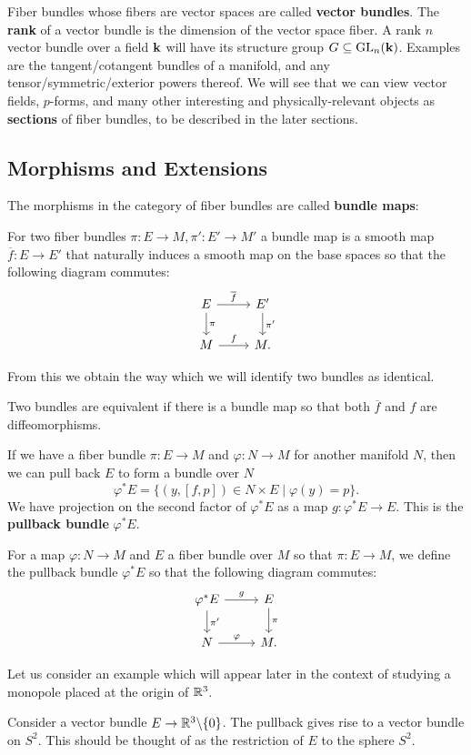 		Fiber bundles whose fibers are vector spaces are called \textbf{vector bundles}. The \textbf{rank} of a vector bundle is the dimension of the vector space fiber. A rank $n$ vector bundle over a field $\mathbf{k}$ will have its structure group $G \subseteq \mathrm{GL}_n(\mathbf{k})$. Examples are the tangent/cotangent bundles of a manifold, and any tensor/symmetric/exterior powers thereof. We will see that we can view vector fields, $p$-forms, and many other interesting and physically-relevant objects as \textbf{sections} of fiber bundles, to be described in the later sections.
		
		\subsection{Morphisms and Extensions}
		The morphisms in the category of fiber bundles are called \textbf{bundle maps}:
		
		\begin{defn}
			For two fiber bundles $\pi: E \rightarrow M, \pi': E' \rightarrow M'$ a bundle map is a smooth map $\overline f: E \rightarrow E'$ that naturally induces a smooth map on the base spaces so that the following diagram commutes:
			\[
			\begin{tikzcd}
			E \arrow{r}{\overline f} \arrow{d}{\pi} & E' \arrow{d}{\pi'} \\
			M \arrow{r}{f} & M.
			\end{tikzcd}
			\]
		\end{defn}
		From this we obtain the way which we will identify two bundles as identical.
		\begin{defn}
			Two bundles are equivalent if there is a bundle map so that both $\overline f$ and $f$ are diffeomorphisms. 
		\end{defn}
		If we have a fiber bundle $\pi: E \rightarrow M$ and $\varphi: N \rightarrow M$ for another manifold $N$, then we can pull back $E$ to form a bundle over $N$
		\[
			\varphi^* E = \{(y,[f,p]) \in N \times E \mid \varphi(y) = p \}.
		\]
		We have projection on the second factor of $\varphi^* E$ as a map $g: \varphi^* E \rightarrow E$. 
		This is the \textbf{pullback bundle} $\varphi^* E$.
		\begin{defn}
			For a map $\varphi: N \rightarrow M$ and $E$ a fiber bundle over $M$ so that $\pi: E \rightarrow M$, we define the pullback bundle $\varphi^* E$ so that the following diagram commutes:
			\[
			\begin{tikzcd}
			\varphi^* E \arrow{r}{g} \arrow{d}{\pi'} & E \arrow{d}{\pi} \\
			N \arrow{r}{\varphi} & M.
			\end{tikzcd}
			\]
		\end{defn}
		Let us consider an example which will appear later in the context of studying a monopole placed at the origin of $\mathbb{R}^3$.
		\begin{eg}
			Consider a vector bundle $E  \to \mathbb{R}^3 \backslash \{0\}$. The pullback  gives rise to a vector bundle on $S^2$. This should be thought of as the restriction of $E$ to the sphere $S^2$.
		\end{eg}
		
